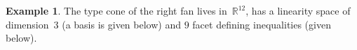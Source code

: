 \documentclass{amsart}
\theoremstyle{definition}
\newtheorem{example}[theorem]{Example}
\newcommand{\R}{\mathbb{R}} %
\begin{document}
\begin{example}
%
%

\noindent
The type cone of the right fan lives in~$\R^{12}$, has a linearity space of dimension~$3$ (a basis is given below) and $9$ facet defining inequalities (given below). 


\end{example}
\end{document}

